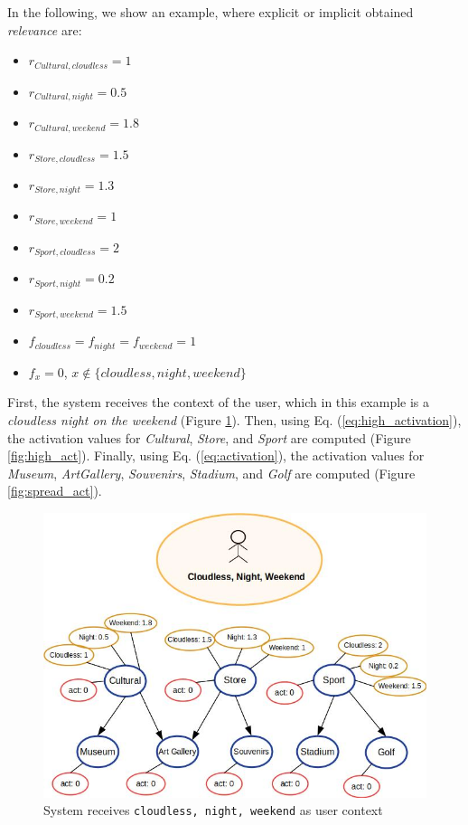 In the following, we show an example, where explicit or implicit obtained \textit{relevance} are:

\begin{itemize}
    \item $r_{Cultural, cloudless} = 1$
    \item $r_{Cultural, night} = 0.5$
    \item $r_{Cultural, weekend} = 1.8$
    \item $r_{Store, cloudless} = 1.5$
    \item $r_{Store, night} = 1.3$
    \item $r_{Store, weekend} = 1$
    \item $r_{Sport, cloudless} = 2$
    \item $r_{Sport, night} = 0.2$
    \item $r_{Sport, weekend} = 1.5$
    \item $f_{cloudless} = f_{night} = f_{weekend} = 1$
    \item $f_x = 0$, $x \notin \{cloudless, night, weekend\}$
\end{itemize}

First, the system receives the context of the user, which in this example is a {\it cloudless night on the weekend} (Figure \ref{fig:init_act}). Then, using Eq. (\ref{eq:high_activation}), the activation values for \textit{Cultural}, \textit{Store}, and \textit{Sport} are computed (Figure \ref{fig:high_act}). Finally, using Eq. (\ref{eq:activation}), the activation values for \textit{Museum}, \textit{ArtGallery}, \textit{Souvenirs}, \textit{Stadium}, and \textit{Golf} are computed (Figure \ref{fig:spread_act}).

\begin{figure}[h]
\centering
\includegraphics[scale=0.45]{draws/initial_act.jpg}
\caption{System receives {\tt cloudless, night, weekend} as user context}
\label{fig:init_act}
\end{figure}


